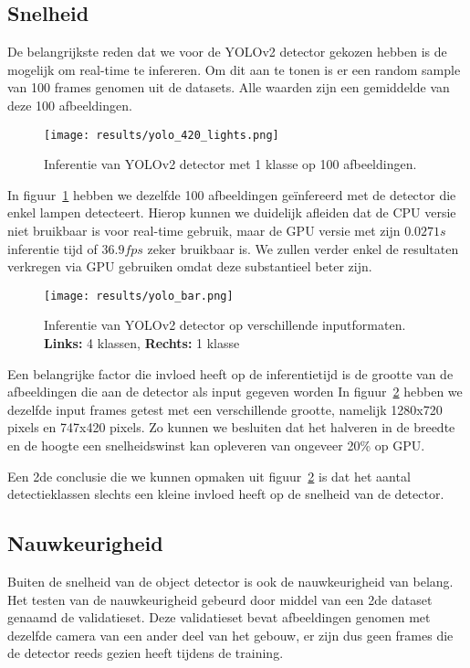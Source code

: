 \subsection{Snelheid}

De belangrijkste reden dat we voor de YOLOv2 detector gekozen hebben is de mogelijk om real-time te infereren.
Om dit aan te tonen is er een random sample van 100 frames genomen uit de datasets. Alle waarden zijn een gemiddelde van deze 100 afbeeldingen.

\begin{figure}
    \texttt{[image: results/yolo\_420\_lights.png]}
    \caption{Inferentie van YOLOv2 detector met 1 klasse op 100 afbeeldingen.}
    \label{fig:speed_lights}
\end{figure}

In figuur~\ref{fig:speed_lights} hebben we dezelfde 100 afbeeldingen ge\"{i}nfereerd met de detector die enkel lampen detecteert.
Hierop kunnen we duidelijk afleiden dat de \gls{CPU} versie niet bruikbaar is voor real-time gebruik, maar de \gls{GPU} versie
met zijn $0.0271 s$ inferentie tijd of $36.9 fps$ zeker bruikbaar is. We zullen verder enkel de resultaten verkregen via \gls{GPU}
gebruiken omdat deze substantieel beter zijn.

\begin{figure}[h]
    \texttt{[image: results/yolo\_bar.png]}
    \caption{Inferentie van YOLOv2 detector op verschillende inputformaten. \textbf{Links:} 4 klassen, \textbf{Rechts:} 1 klasse}
    \label{fig:speed_bar}
\end{figure}

Een belangrijke factor die invloed heeft op de inferentietijd is de grootte van de afbeeldingen die aan de detector als input gegeven worden
In figuur~\ref{fig:speed_bar} hebben we dezelfde input frames getest met een verschillende grootte, namelijk 1280x720 pixels en 747x420 pixels.
Zo kunnen we besluiten dat het halveren in de breedte en de hoogte een snelheidswinst kan opleveren van ongeveer 20\% op GPU.

Een 2de conclusie die we kunnen opmaken uit figuur~\ref{fig:speed_bar} is dat het aantal detectieklassen slechts een kleine invloed heeft op de snelheid van de detector.


\subsection{Nauwkeurigheid}

Buiten de snelheid van de object detector is ook de nauwkeurigheid van belang.
Het testen van de nauwkeurigheid gebeurd door middel van een 2de dataset genaamd de validatieset. Deze validatieset bevat afbeeldingen genomen met dezelfde camera
van een ander deel van het gebouw, er zijn dus geen frames die de detector reeds gezien heeft tijdens de training.

